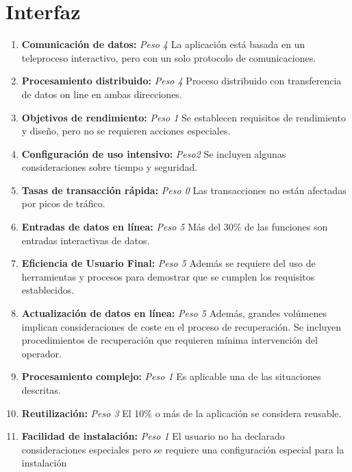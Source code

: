 \documentclass[11pt,a4paper,spanish,twoside]{book}
\begin{document}
\section{Interfaz}
\begin{enumerate}[{\bf 1.}]

\item {\bf Comunicación de datos:} \emph{Peso 4} La aplicación está basada en
  un teleproceso interactivo, pero con un solo protocolo de comunicaciones.

\item {\bf Procesamiento distribuido:} \emph{Peso 4} Proceso distribuido
  con transferencia de datos on line en ambas direcciones. 

\item {\bf Objetivos de rendimiento:} \emph{Peso 1} Se establecen requisitos
  de rendimiento y diseño, pero no se requieren acciones especiales.

\item {\bf Configuración de uso intensivo:} \emph{Peso2} Se incluyen algunas
  consideraciones sobre tiempo y seguridad. 

\item {\bf Tasas de transacción rápida:} \emph{Peso 0} Las transacciones no
  están afectadas por picos de tráfico. 

\item {\bf Entradas de datos en línea:} \emph{Peso 5} Más del 30\% de las
  funciones son entradas interactivas de datos. 

\item {\bf Eficiencia de Usuario Final:} \emph{Peso 5} Además se requiere del
  uso de herramientas y procesos para demostrar que se cumplen los requisitos
  establecidos.

\item {\bf Actualización de datos en línea:} \emph{Peso 5} Además, grandes
  volúmenes implican consideraciones de coste en el proceso de
  recuperación. Se incluyen procedimientos de recuperación que requieren
  mínima intervención del operador. 

\item {\bf Procesamiento complejo:} \emph{Peso 1} Es aplicable una de las
  situaciones descritas. 

\item {\bf Reutilización:} \emph{Peso 3} El 10\% o más de la aplicación se
  considera reusable. 

\item {\bf Facilidad de instalación:} \emph{Peso 1} El usuario no ha
  declarado consideraciones especiales pero se requiere una configuración
  especial para la instalación 


\end{enumerate}
\end{document}
